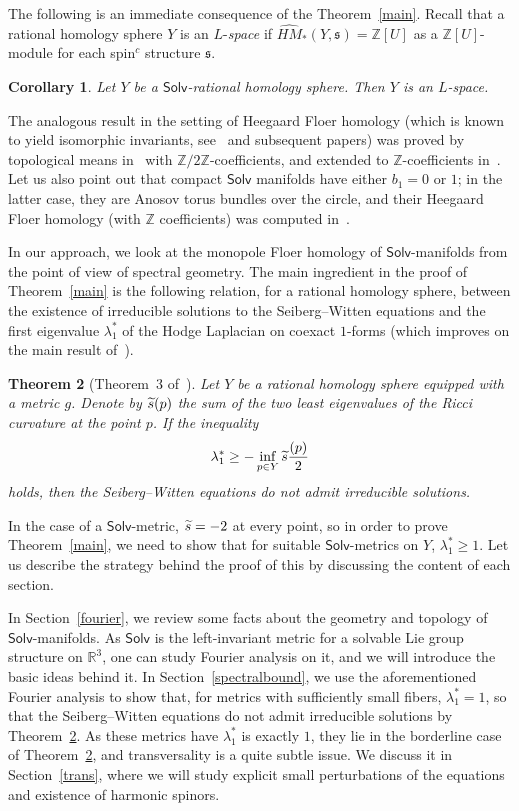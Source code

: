 \documentclass[11pt]{article}
\newtheorem{theo}{Theorem}[section]
\newtheorem{coro}[theo]{Corollary}
\theoremstyle{definition}
\numberwithin{equation}{section}
\numberwithin{figure}{section}
\numberwithin{table}{section}
\newcommand{\HMf}{\widehat{\mathit{HM}}}
\newcommand{\Solv}{\mathsf{Solv}}
\newcommand{\spin}{\mathfrak{s}}
\let\oldtilde\tilde
\renewcommand*{\tilde}[1]{\mathchoice{\widetilde{#1}}{\widetilde{#1}}{\oldtilde{#1}}{\oldtilde{#1}}}\let\oldhat\hat
\renewcommand*{\hat}[1]{\mathchoice{\widehat{#1}}{\widehat{#1}}{\oldhat{#1}}{\oldhat{#1}}}
\begin{document}
The following is an immediate consequence of the Theorem~\ref{main}. Recall that a rational homology sphere $Y$ is an $L$-\emph{space} if $\HMf_*(Y,\spin)=\mathbb{Z}[U]$ as a $\mathbb{Z}[U]$-module for each spin$^c$ structure $\spin$.


\begin{coro}\label{corol}
Let $Y$ be a $\Solv$-rational homology sphere. Then $Y$ is an $L$-space.
\end{coro}

The analogous result in the setting of Heegaard Floer homology (which is known to yield isomorphic invariants, see~\cite{CGH1,HFHM1} and subsequent papers) was proved by topological means in~\cite{BCW} with $\mathbb{Z}/2\mathbb{Z}$-coefficients, and extended to $\mathbb{Z}$-coefficients in~\cite{RR}. Let us also point out that compact $\Solv$ manifolds have either $b_1=0$ or $1$; in the latter case, they are Anosov torus bundles over the circle, and their Heegaard Floer homology (with $\mathbb{Z}$ coefficients) was computed in~\cite{Bal}.


In our approach, we look at the monopole Floer homology of $\Solv$-manifolds from the point of view of spectral geometry. The main ingredient in the proof of Theorem~\ref{main} is the following relation, for a rational homology sphere, between the existence of irreducible solutions to the Seiberg--Witten equations and the first eigenvalue $\lambda_1^*$ of the Hodge Laplacian on coexact $1$-forms (which improves on the main result of~\cite{Lin4}).


\begin{theo}[Theorem~$3$ of~\cite{LL}]\label{spectral}
Let $Y$ be a rational homology sphere equipped with a metric $g$. Denote by $\tilde{s}(p)$ the sum of the two least eigenvalues of the Ricci curvature at the point $p$. If the inequality
\[
\lambda_1^*\geq -\inf_{p\in Y}\tilde{s}\frac{(p)}{2}
\]
holds, then the Seiberg--Witten equations do not admit irreducible solutions.
\end{theo}

In the case of a $\Solv$-metric, $\tilde{s}=-2$ at every point, so in order to prove Theorem~\ref{main}, we need to show that for suitable $\Solv$-metrics on $Y$, $\lambda_1^*\geq 1$. Let us describe the strategy behind the proof of this by discussing the content of each section.


In Section~\ref{fourier}, we review some facts about the geometry and topology of $\Solv$-manifolds. As $\Solv$ is the left-invariant metric for a solvable Lie group structure on $\mathbb{R}^3$, one can study Fourier analysis on it, and we will introduce the basic ideas behind it. In Section~\ref{spectralbound}, we use the aforementioned Fourier analysis to show that, for metrics with sufficiently small fibers, $\lambda_1^*= 1$, so that the Seiberg--Witten equations do not admit irreducible solutions by Theorem~\ref{spectral}. As these metrics have $\lambda^*_1$ is exactly $1$, they lie in the borderline case of Theorem~\ref{spectral}, and transversality is a quite subtle issue. We discuss it in Section~\ref{trans}, where we will study explicit small perturbations of the equations and existence of harmonic spinors.
\end{document}
